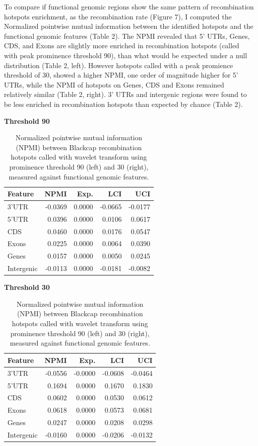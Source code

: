 \documentclass[12pt,a4paper]{article}
\begin{document}
To compare if functional genomic regions show the same pattern of recombination hotspots enrichment,
as the recombination rate (Figure 7), I computed the Normalized pointwise mutual information between
the identified hotspots and the functional genomic features (Table 2). The NPMI revealed that 5'
UTRs, Genes, CDS, and Exons are slightly more enriched in recombination hotspots (called with peak prominence threshold 90),
than what would be expected under a null distribution (Table 2, left). However hotspots called with
a peak promience threshold of 30, showed a higher NPMI, one order of magnitude higher for 5' UTRs,
while the NPMI of hotspots on Genes, CDS and Exons remained relatively similar (Table 2, right).
3' UTRs and intergenic regions were found to be less enriched in recombination hotspots than
expected by chance (Table 2).
\begin{table}[htp]
	\raggedright
	\caption{Normalized pointwise mutual information (NPMI) between Blackcap recombination hotspots called with wavelet transform using prominence threshold 90 (left) and 30 (right), measured against functional genomic features.}

	\begin{minipage}[t]{0.45\textwidth}
		\centering
		\small
		\textbf{Threshold 90}\\[2mm]
		\begin{tabular}{lrrrr}
			\hline
			Feature    & NPMI    & Exp.   & LCI     & UCI     \\
			\hline
			3'UTR      & -0.0369 & 0.0000 & -0.0665 & -0.0177 \\
			5'UTR      & 0.0396  & 0.0000 & 0.0106  & 0.0617  \\
			CDS        & 0.0460  & 0.0000 & 0.0176  & 0.0547  \\
			Exons      & 0.0225  & 0.0000 & 0.0064  & 0.0390  \\
			Genes      & 0.0157  & 0.0000 & 0.0050  & 0.0245  \\
			Intergenic & -0.0113 & 0.0000 & -0.0181 & -0.0082 \\
			\hline
		\end{tabular}
	\end{minipage}
	\hspace{1cm}
	\begin{minipage}[t]{0.45\textwidth}
		\centering
		\small
		\textbf{Threshold 30}\\[2mm]
		\begin{tabular}{lrrrr}
			\hline
			Feature    & NPMI    & Exp.    & LCI     & UCI     \\
			\hline
			3'UTR      & -0.0556 & -0.0000 & -0.0608 & -0.0464 \\
			5'UTR      & 0.1694  & 0.0000  & 0.1670  & 0.1830  \\
			CDS        & 0.0602  & 0.0000  & 0.0530  & 0.0612  \\
			Exons      & 0.0618  & 0.0000  & 0.0573  & 0.0681  \\
			Genes      & 0.0247  & 0.0000  & 0.0208  & 0.0298  \\
			Intergenic & -0.0160 & 0.0000  & -0.0206 & -0.0132 \\
			\hline
		\end{tabular}
	\end{minipage}


\end{table}
\end{document}
